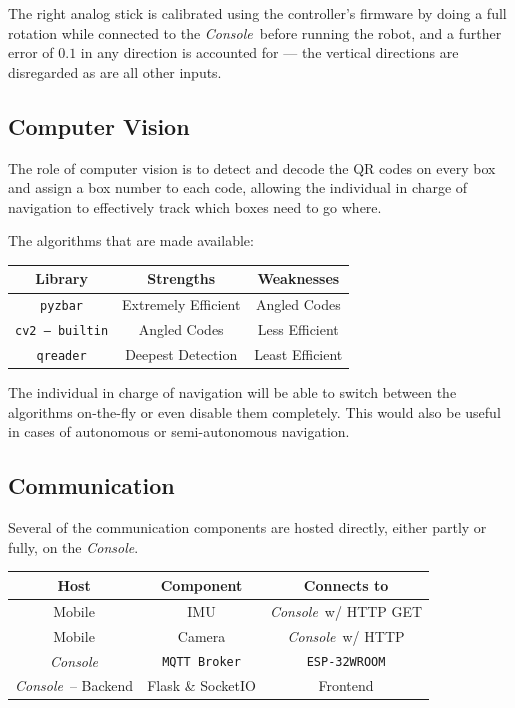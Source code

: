 \documentclass[a4paper,12pt]{article}
\newcommand{\esp}{\texttt{ESP-32WROOM}}
\newcommand{\con}{\textit{Console}}
\begin{document}
The right analog stick is calibrated using the controller's firmware by doing a full rotation while connected to the \con\ before running the robot, and a further error of $0.1$ in any direction is accounted for --- the vertical directions are disregarded as are all other inputs.

\subsection{Computer Vision}
The role of computer vision is to detect and decode the QR codes on every box and assign a box number to each code, allowing the individual in charge of navigation to effectively track which boxes need to go where.

The algorithms that are made available:
\begin{center}
    \bgroup
    \def\arraystretch{1.5}
    {
    \begin{tabular}{|c|c|c|}
        \hline
        \textbf{Library} & \textbf{Strengths} & \textbf{Weaknesses} \\
        \hline
        \texttt{pyzbar} & Extremely Efficient & Angled Codes \\
        \hline
        \texttt{cv2 -- builtin} & Angled Codes & Less Efficient \\
        \hline
        \texttt{qreader} & Deepest Detection & Least Efficient \\
        \hline
    \end{tabular}}
    \egroup
\end{center}
The individual in charge of navigation will be able to switch between the algorithms on-the-fly or even disable them completely. This would also be useful in cases of autonomous or semi-autonomous navigation.
\subsection{Communication}
Several of the communication components are hosted directly, either partly or fully, on the \con.
\begin{center}
    \bgroup
    \def\arraystretch{1.5}
    {
    \begin{tabular}{|c|c|c|}
        \hline
        \textbf{Host} & \textbf{Component} & \textbf{Connects to} \\
        \hline
        Mobile & IMU & \con\ w/ HTTP GET \\
        \hline
        Mobile & Camera & \con\ w/ HTTP \\
        \hline
        \con & \texttt{MQTT Broker} & \esp \\
        \hline
        \con\ -- Backend & Flask \& SocketIO & Frontend \\
        \hline
    \end{tabular}}
    \egroup
\end{center}
\end{document}
